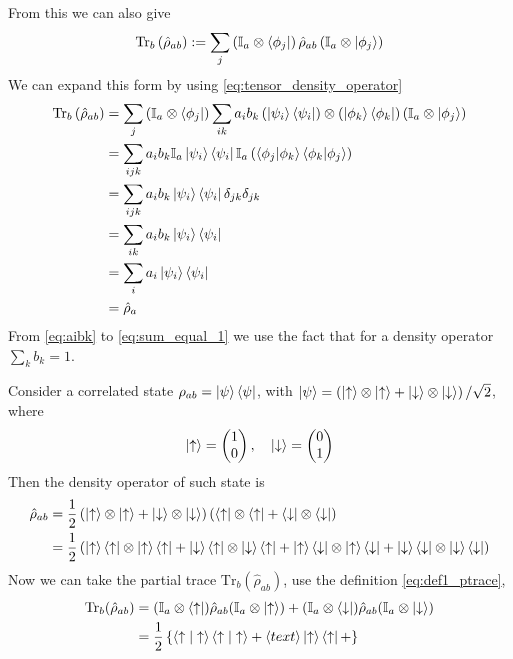 From this we can also give 
\begin{align}
    \mathrm{Tr}_b \left(\hat{\rho}_{ab}\right):= \sum_j \left(\mathbb{I}_a \otimes \bra{\phi_j}\right) \hat{\rho}_{ab} \left(\mathbb{I}_a \otimes \ket{\phi_j}\right) \label{eq:def1_ptrace}
\end{align}
We can expand this form by using \cref{eq:tensor_density_operator}
\begin{align}
    \mathrm{Tr}_b \left(\hat{\rho}_{ab}\right) &= \sum_j \left(\mathbb{I}_a \otimes \bra{\phi_j}\right) \sum_{ik} a_i b_k \left(\ket{\psi_i} \bra{\psi_i}\right) \otimes \left(\ket{\phi_k} \bra{\phi_k}\right) \left(\mathbb{I}_a \otimes \ket{\phi_j}\right) \\
    &= \sum_{ijk} a_ib_k \mathbb{I}_a \ket{\psi_i} \bra{\psi_i} \mathbb{I}_a \left(\braket{\phi_j|\phi_k} \braket{\phi_k|\phi_j}\right) \\
    &= \sum_{ijk} a_ib_k \ket{\psi_i} \bra{\psi_i} \delta_{jk} \delta_{jk}\label{eq:aibk} \\
    & = \sum_{ik} a_i b_k \ket{\psi_i} \bra{\psi_i}  \label{eq:sum_equal_1}\\
    & = \sum_i a_i \ket{\psi_i} \bra{\psi_i} \\
    &= \hat{\rho}_a
\end{align}
From \cref{eq:aibk} to \cref{eq:sum_equal_1} we use the fact that for a density operator $\sum_k b_k = 1$.
\begin{ex}
    Consider a correlated state $\rho_{ab} = \ket{\psi} \bra{\psi}$, with $\ket{\psi} = \left(\ket{\uparrow} \otimes \ket{\uparrow} + \ket{\downarrow} \otimes \ket{\downarrow}\right)/ \sqrt{2} $, where 
    \begin{eqnarray}
        \ket{\uparrow} = \begin{pmatrix}
            1 \\
            0
        \end{pmatrix}, \quad 
        \ket{\downarrow} = \begin{pmatrix}
            0 \\
            1
        \end{pmatrix}
    \end{eqnarray}
    Then the density operator of such state is 
    \begin{align}
        \hat{\rho}_{ab} &= \frac{1}{2} \left( \ket{\uparrow} \otimes \ket{\uparrow} + \ket{\downarrow} \otimes \ket{\downarrow} \right) \left( \bra{\uparrow} \otimes \bra{\uparrow} + \bra{\downarrow} \otimes \bra{\downarrow} \right)\\
        &= \frac{1}{2} \left( \ket{\uparrow} \bra{\uparrow} \otimes \ket{\uparrow} \bra{\uparrow} + \ket{\downarrow} \bra{\uparrow} \otimes \ket{\downarrow} \bra{\uparrow} + \ket{\uparrow} \bra{\downarrow} \otimes \ket{\uparrow} \bra{\downarrow} + \ket{\downarrow} \bra{\downarrow} \otimes \ket{\downarrow} \bra{\downarrow} \right)
    \end{align}
    Now we can take the partial trace $\mathrm{Tr}_b (\hat{\rho}_{ab})$, use the definition \cref{eq:def1_ptrace}, 
    \begin{align*}
        \mathrm{Tr}_b (\hat{\rho}_{ab}) &= (\mathbb{I}_a \otimes \bra{\uparrow} ) \hat{\rho}_{ab} (\mathbb{I}_a \otimes \ket{\uparrow} ) + (\mathbb{I}_a \otimes \bra{\downarrow} ) \hat{\rho}_{ab} (\mathbb{I}_a \otimes \ket{\downarrow} ) \\
        &= \frac{1}{2} \left\{ \braket{\uparrow|\uparrow}  \braket{\uparrow|\uparrow} + \braket{text}\ket{\uparrow} \bra{\uparrow} +  \right\}
    \end{align*}
\end{ex}


